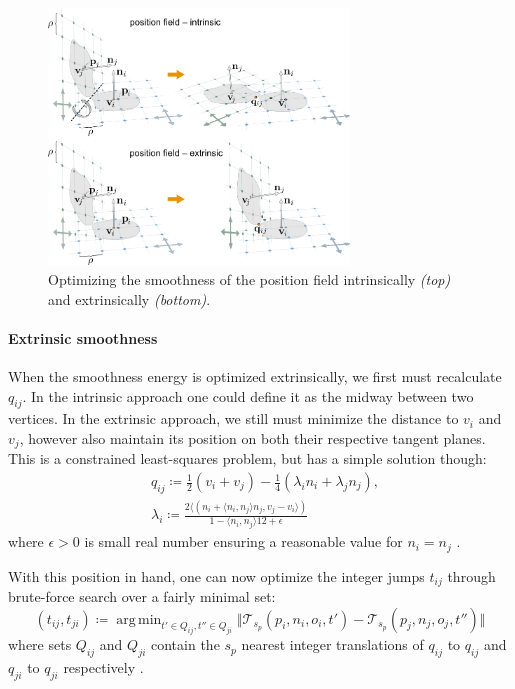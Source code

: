 \documentclass{ACGSeminar}
\DeclareMathOperator*{\argmin}{arg\,min}
\begin{document}
\begin{figure}[htb!]
	\begin{centering}
		\includegraphics[width=8cm]{img/position-field-intrinsic-extrinsic.png}\par
	\end{centering}
	\caption{Optimizing the smoothness of the position field intrinsically \textit{(top)} and extrinsically \textit{(bottom)}. \cite{jakob2015instant}}
	\label{fig:position-field-intrinsic-extrinsic}
\end{figure}

\paragraph{Extrinsic smoothness}
When the smoothness energy is optimized extrinsically, we first must recalculate $q_{ij}$. In the intrinsic approach one could define it as the midway between two vertices. In the extrinsic approach, we still must minimize the distance to $v_i$ and $v_j$, however also maintain its position on both their respective tangent planes. This is a constrained least-squares problem, but has a simple solution though:
\begin{equation*}
\begin{split}
	& q_{ij} \coloneqq \frac{1}{2}(v_i + v_j) - \frac{1}{4}(\lambda_i n_i + \lambda_j n_j),\\
	& \lambda_i \coloneqq \frac{2 \langle (n_i + \langle n_i, n_j \rangle n_j, v_j - v_i \rangle)}{1 - \langle n_i, n_j \rangle 12 + \epsilon}
\end{split}
\end{equation*}
where $\epsilon > 0$ is small real number ensuring a reasonable value for $n_i = n_j$ \cite{jakob2015instant}.\bigskip

With this position in hand, one can now optimize the integer jumps $t_{ij}$ through brute-force search over a fairly minimal set:
\begin{equation*}
	(t_{ij}, t_{ji}) \coloneqq \argmin_{t' \in Q_{ij}, t'' \in Q_{ji}} \Vert \mathcal{T}_{s_p}(p_i, n_i, o_i, t') - \mathcal{T}_{s_p}(p_j, n_j, o_j, t'') \Vert
\end{equation*}
where sets $Q_{ij}$ and $Q_{ji}$ contain the $s_p$ nearest integer translations of $q_{ij}$ to $q_{ij}$ and $q_{ji}$ to $q_{ji}$ respectively \cite{jakob2015instant}.\bigskip
\end{document}
